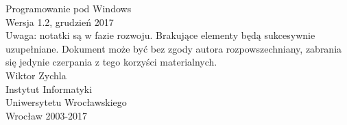 ﻿\begin{titlepage}
\begin{center}
\textsf{
\Huge Programowanie pod Windows\\
\vspace*{1.5cm}
\small Wersja 1.2, grudzień 2017\\
\vspace*{1.5cm}
Uwaga: notatki są w fazie rozwoju. Brakujące elementy będą sukcesywnie uzupełniane. 
Dokument może być bez zgody autora rozpowszechniany, zabrania się jedynie czerpania z tego 
korzyści materialnych.\\
\vspace*{4.5cm}
\Large Wiktor Zychla\\
\vspace{1.5cm}
\Large
Instytut Informatyki\\Uniwersytetu Wrocławskiego\\
\vfill
Wrocław 2003-2017}
\end{center}
\end{titlepage}
